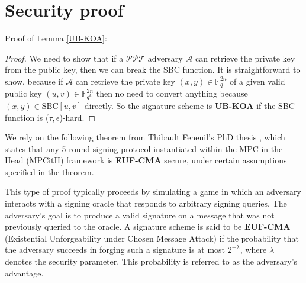 \documentclass[english]{article}
\begin{document}
\section{Security proof}\label{appendix:proof}
	Proof of Lemma \ref{UB-KOA}:
	\begin{proof}
		We need to show that if a $\mathcal{PPT}$ adversary $\mathcal{A}$ can retrieve the private key from the public key, then we can break the SBC function.
		It is straightforward to show, because if $\mathcal{A}$ can retrieve the private key $(x, y) \in \mathbb{F}_{q}^{2n}$ of a given valid public key $(u, v) \in \mathbb{F}_{q^k}^{2n}$ then no need to convert anything because $(x, y) \in \text{SBC}[u, v]$ directly. So the signature scheme is \textbf{UB-KOA} if the SBC function is ($\tau, \epsilon$)-hard.
	\end{proof}
	
	We rely on the following theorem from Thibault Feneuil's PhD thesis \cite{feneu2023}, which states that any 5-round signing protocol instantiated within the MPC-in-the-Head (MPCitH) framework is \textbf{EUF-CMA} secure, under certain assumptions specified in the theorem.
	
	This type of proof typically proceeds by simulating a game in which an adversary interacts with a signing oracle that responds to arbitrary signing queries. The adversary's goal is to produce a valid signature on a message that was not previously queried to the oracle. A signature scheme is said to be \textbf{EUF-CMA} (Existential Unforgeability under Chosen Message Attack) if the probability that the adversary succeeds in forging such a signature is at most $2^{-\lambda}$, where $\lambda$ denotes the security parameter. This probability is referred to as the adversary's advantage.
	
\end{document}
